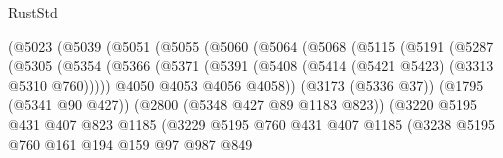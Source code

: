 \begin{lexlean}{RustStd}
\begin{coremodule}
                          (@5023
                            (@5039
                              (@5051
                                (@5055
                                  (@5060
                                    (@5064
                                      (@5068
                                        (@5115
                                          (@5191
                                            (@5287
                                              (@5305
                                                (@5354
                                                  (@5366
                                                    (@5371
                                                      (@5391
                                                        (@5408
                                                          (@5414
                                                            (@5421 @5423)
                                                            (@3313 @5310 @760)))))
                                                    @4050
                                                    @4053
                                                    @4056
                                                    @4058))
                                                (@3173 (@5336 @37))
                                                (@1795 (@5341 @90 @427))
                                                (@2800 (@5348 @427 @89 @1183 @823))
                                                (@3220
                                                  @5195
                                                  @431
                                                  @407
                                                  @823
                                                  @1185
                                                  (@3229
                                                    @5195
                                                    @760
                                                    @431
                                                    @407
                                                    @1185
                                                    (@3238
                                                      @5195
                                                      @760
                                                      @161
                                                      @194
                                                      @159
                                                      @97
                                                      @987
                                                      @849

\end{coremodule}
\end{lexlean}

